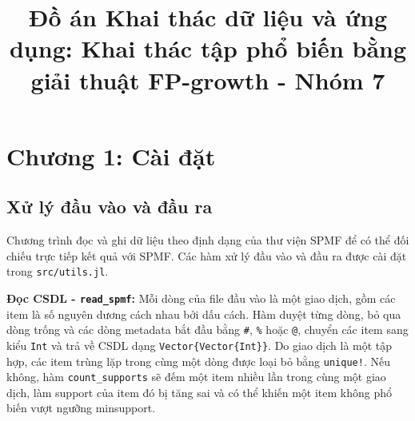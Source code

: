 \documentclass[conference]{IEEEtran}
\begin{document}
\title{Đồ án Khai thác dữ liệu và ứng dụng: Khai thác tập phổ biến bằng giải thuật FP-growth - Nhóm 7}

\author{
\and
{}
}

\maketitle

\section{Chương 1: Cài đặt}

\subsection{Xử lý đầu vào và đầu ra}
\label{subsec:io}
Chương trình đọc và ghi dữ liệu theo định dạng của thư viện SPMF \cite{fournierviger2014spmf} để có thể đối chiếu trực tiếp kết quả với SPMF. Các hàm xử lý đầu vào và đầu ra được cài đặt trong \texttt{src/utils.jl}.

\textbf{Đọc CSDL - \texttt{read\_spmf}:}
Mỗi dòng của file đầu vào là một giao dịch, gồm các item là số nguyên dương cách nhau bởi dấu cách. Hàm duyệt từng dòng, bỏ qua dòng trống và các dòng metadata bắt đầu bằng \texttt{\#}, \texttt{\%} hoặc \texttt{@}, chuyển các item sang kiểu \texttt{Int} và trả về CSDL dạng \texttt{Vector\{Vector\{Int\}\}}. Do giao dịch là một tập hợp, các item trùng lặp trong cùng một dòng được loại bỏ bằng \texttt{unique!}. Nếu không, hàm \texttt{count\_supports} sẽ đếm một item nhiều lần trong cùng một giao dịch, làm support của item đó bị tăng sai và có thể khiến một item không phổ biến vượt ngưỡng minsupport.
\end{document}
